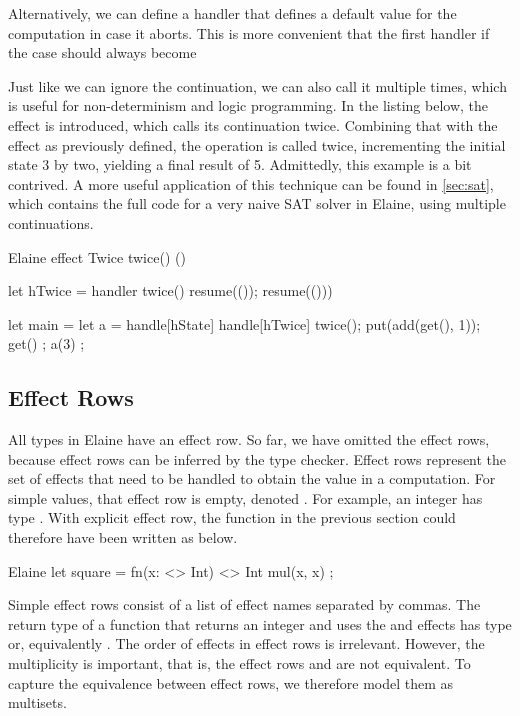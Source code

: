 
Alternatively, we can define a handler that defines a default value for the computation in case it aborts. This is more convenient that the first handler if the  case should always become


Just like we can ignore the continuation, we can also call it multiple times, which is useful for non-determinism and logic programming. In the listing below, the  effect is introduced, which calls its continuation twice. Combining that with the  effect as previously defined, the  operation is called twice, incrementing the initial state 3 by two, yielding a final result of 5. Admittedly, this example is a bit contrived. A more useful application of this technique can be found in \cref{sec:sat}, which contains the full code for a very naive SAT solver in Elaine, using multiple continuations.

\begin{lst}{Elaine}
effect Twice {
    twice() ()
}

let hTwice = handler {
    twice() {
        resume(());
        resume(()))
    }
}

let main = {
    let a = handle[hState] handle[hTwice] {
        twice();
        put(add(get(), 1));
        get()
    };
    a(3)
};
\end{lst}
%
\subsection{Effect Rows}

All types in Elaine have an effect row. So far, we have omitted the effect rows, because effect rows can be inferred by the type checker. Effect rows represent the set of effects that need to be handled to obtain the value in a computation. For simple values, that effect row is empty, denoted \el{<>}. For example, an integer has type . With explicit effect row, the  function in the previous section could therefore have been written as below.

\begin{lst}{Elaine}
let square = fn(x: <> Int) <> Int {
    mul(x, x)
};
\end{lst}
%
Simple effect rows consist of a list of effect names separated by commas. The return type of a function that returns an integer and uses the  and  effects has type  or, equivalently . The order of effects in effect rows is irrelevant. However, the multiplicity is important, that is, the effect rows  and  are not equivalent. To capture the equivalence between effect rows, we therefore model them as multisets.

